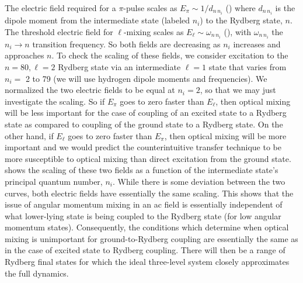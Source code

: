 The electric field required for a $\pi$-pulse scales as $E_{\pi} \sim
1/d_{n\, n_i}$ () where $d_{n \, n_i}$ is the dipole moment from the
intermediate state (labeled $n_i$) to the Rydberg state, $n$.  The threshold
electric field for $\ell$-mixing scales as $E_{\ell} \sim \omega_{n \, n_i}$
(), with $\omega_{n \, n_i}$ the $n_i \rightarrow n$ transition
frequency.  So both fields are decreasing as $n_i$ increases and approaches
$n$.  To check the scaling of these fields, we consider excitation to the
$n=80,\ell = 2$ Rydberg state via an intermediate $\ell=1$ state that varies from
$n_i =$ 2 to 79 (we will use hydrogen dipole moments and frequencies).  We
normalized the two electric fields to be equal at
$n_i=2$, so that we may just investigate the scaling.  So if $E_{\pi}$ goes to
zero faster than
$E_{\ell}$, then optical mixing will be less important for the case of
coupling of an excited state to a Rydberg state as compared to coupling of the
ground state to a Rydberg state.  On the other hand, if
$E_{\ell}$ goes to zero faster than $E_{\pi}$, then optical mixing will be more
important and we would predict the counterintuitive transfer technique to be
more susceptible to optical mixing than direct excitation from the ground state. 
 shows the scaling of these two fields as a function of the
intermediate state's principal quantum number, $n_i$.  While there is some
deviation between the two curves, both electric fields have essentially the same
scaling.   This shows that the issue of angular momentum mixing in an ac field is
essentially independent of what lower-lying state is being coupled to  the
Rydberg state (for low angular momentum states).  Consequently, the conditions
which determine when optical mixing is unimportant for ground-to-Rydberg
coupling are essentially the same as in the case of excited state to Rydberg
coupling.  There will then be a range of Rydberg final states for which the
ideal three-level system closely approximates the full dynamics.

%
